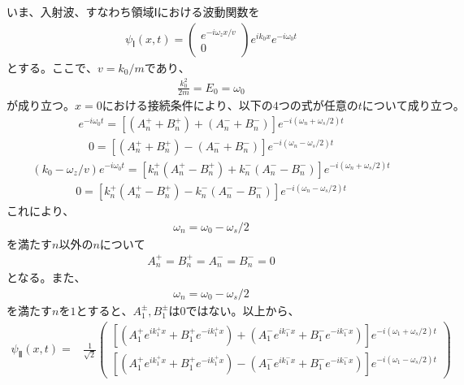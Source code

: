 いま、入射波、すなわち領域Ⅰにおける波動関数を
\begin{align}
{\psi}_{Ⅰ}(x,t)=
\begin{pmatrix}
e^{-i\omega_{z}x/v} \\
0
\end{pmatrix}
e^{ik_{0}x}e^{-i\omega_{0}t}
\end{align}
$とする。ここで、v={k_{0}}/{m}であり、$
\begin{align}
\frac{k_{0}^2}{2m}=E_{0}=\omega_{0}
\end{align}
$が成り立つ。x=0における接続条件により、以下の4つの式が任意のtについて成り立つ。$
\begin{align}
e^{-i\omega_{0}t}=\left[(A_{n}^{+}+B_{n}^{+})+(A_{n}^{-}+B_{n}^{-})\right]e^{-i(\omega_{n}+\omega_{s}/2)t}
\end{align}
\begin{align}
0=\left[(A_{n}^{+}+B_{n}^{+})-(A_{n}^{-}+B_{n}^{-})\right]e^{-i(\omega_{n}-\omega_{s}/2)t}
\end{align}
\begin{align}
(k_{0}-\omega_{z}/v)e^{-i\omega_{0}t}=\left[k_{n}^{+}(A_{n}^{+}-B_{n}^{+})+k_{n}^{-}(A_{n}^{-}-B_{n}^{-})\right]e^{-i(\omega_{n}+\omega_{s}/2)t}
\end{align}
\begin{align}
0=\left[k_{n}^{+}(A_{n}^{+}-B_{n}^{+})-k_{n}^{-}(A_{n}^{-}-B_{n}^{-})\right]e^{-i(\omega_{n}-\omega_{s}/2)t}
\end{align}
これにより、
\begin{align}
\omega_{n}=\omega_{0}-\omega_{s}/2
\end{align}
$を満たすn以外のnについて$
\begin{align}
A_{n}^{+}=B_{n}^{+}=A_{n}^{-}=B_{n}^{-}=0
\end{align}
となる。また、
\begin{align}
\omega_{n}=\omega_{0}-\omega_{s}/2
\end{align}
$を満たすnを1とすると、A_{1}^{\pm},B_{1}^{\pm}は0ではない。以上から、$
\begin{align}
{\psi}_{Ⅱ}(x,t) 
=&\frac{1}{\sqrt{2}}
\begin{pmatrix}
\left[(A_{1}^{+}e^{ik_{1}^{+}x}+B_{1}^{+}e^{-ik_{1}^{+}x})+(A_{1}^{-}e^{ik_{1}^{-}x}+B_{1}^{-}e^{-ik_{1}^{-}x})\right]e^{-i(\omega_{1}+\omega_{s}/2)t} \\
\left[(A_{1}^{+}e^{ik_{1}^{+}x}+B_{1}^{+}e^{-ik_{1}^{+}x})-(A_{1}^{-}e^{ik_{1}^{-}x}+B_{1}^{-}e^{-ik_{1}^{-}x})\right]e^{-i(\omega_{1}-\omega_{s}/2)t}
\end{pmatrix}
\end{align}
